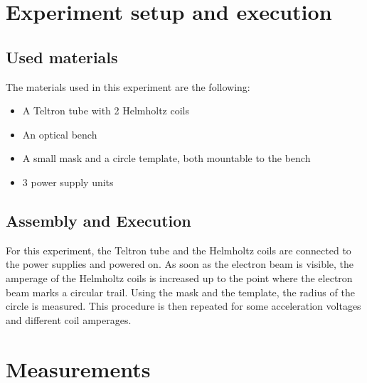 \documentclass{scrreprt}
\begin{document}
\section{Experiment setup and execution}

\subsection{Used materials}
The materials used in this experiment are the following:
\begin{itemize}
\item A Teltron tube with 2 Helmholtz coils
\item An optical bench
\item A small mask and a circle template, both mountable to the bench
\item 3 power supply units
\end{itemize}

\subsection{Assembly and Execution}
For this experiment, the Teltron tube and the Helmholtz coils are connected to the power supplies and powered on. As soon as the electron beam is visible, the amperage of the Helmholtz coils is increased up to the point where the electron beam marks a circular trail. Using the mask and the template, the radius of the circle is measured. This procedure is then repeated for some acceleration voltages and different coil amperages.

\section{Measurements}
\end{document}
